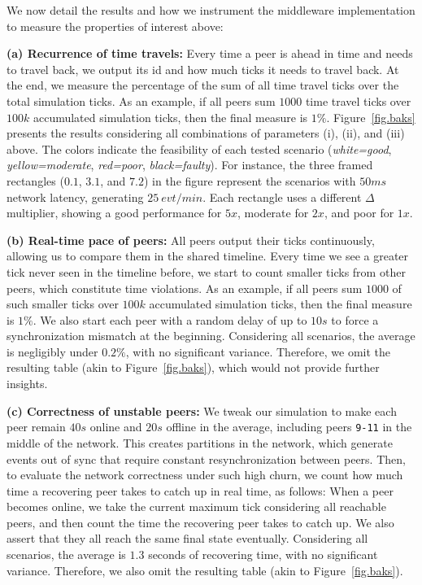 \documentclass[sn-mathphys,iicol]{sn-jnl}%
\newcommand{\code}[1]  {\texttt{\small{#1}}}
\begin{document}
We now detail the results and how we instrument the middleware implementation
to measure the properties of interest above:

\textbf{(a) Recurrence of time travels:}
Every time a peer is ahead in time and needs to travel back, we output its id
and how much ticks it needs to travel back.
At the end, we measure the percentage of the sum of all time travel ticks over
the total simulation ticks.
As an example, if all peers sum $1000$ time travel ticks over $100k$
accumulated simulation ticks, then the final measure is $1\%$.
%
Figure~\ref{fig.baks} presents the results considering all combinations of
parameters (i), (ii), and (iii) above.
The colors indicate the feasibility of each tested scenario
    (\emph{white=good}, \emph{yellow=moderate}, \emph{red=poor},
    \emph{black=faulty}).
%
For instance, the three framed rectangles ($0.1$, $3.1$, and $7.2$) in the
figure represent the scenarios with $50ms$ network latency, generating
$25~evt/min$.
Each rectangle uses a different $\Delta$ multiplier, showing a good performance
for $5x$, moderate for $2x$, and poor for $1x$.

\textbf{(b) Real-time pace of peers:}
All peers output their ticks continuously, allowing us to compare them in the
shared timeline.
Every time we see a greater tick never seen in the timeline before, we start to
count smaller ticks from other peers, which constitute time violations.
As an example, if all peers sum $1000$ of such smaller ticks over $100k$
accumulated simulation ticks, then the final measure is $1\%$.
%
We also start each peer with a random delay of up to $10s$ to force a
synchronization mismatch at the beginning.
%
Considering all scenarios, the average is negligibly under $0.2\%$, with no
significant variance.
Therefore, we omit the resulting table (akin to Figure~\ref{fig.baks}), which
would not provide further insights.

\textbf{(c) Correctness of unstable peers:}
We tweak our simulation to make each peer remain $40s$ online and $20s$
offline in the average, including peers \code{9-11} in the middle of the
network.
This creates partitions in the network, which generate events out of sync that
require constant resynchronization between peers.
%
Then, to evaluate the network correctness under such high churn, we count how
much time a recovering peer takes to catch up in real time, as follows:
When a peer becomes online, we take the current maximum tick considering all
reachable peers, and then count the time the recovering peer takes to catch up.
We also assert that they all reach the same final state eventually.
%
Considering all scenarios, the average is $1.3$ seconds of recovering time,
with no significant variance.
Therefore, we also omit the resulting table (akin to Figure~\ref{fig.baks}).
\end{document}

